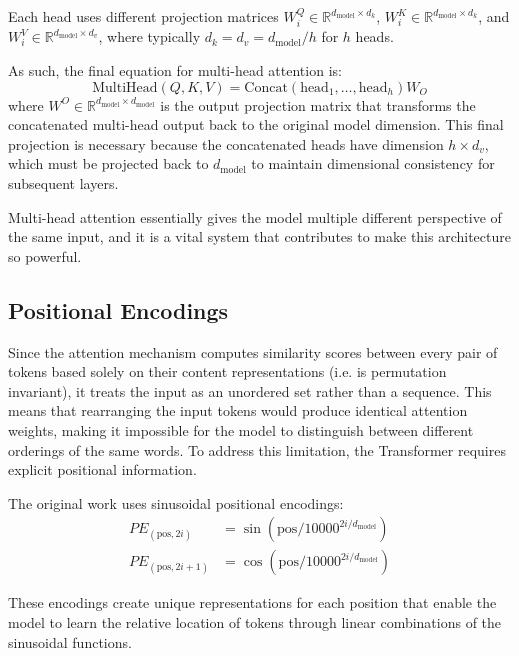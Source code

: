 Each head uses different projection matrices $W_i^Q \in \mathbb{R}^{d_{\text{model}} \times d_k}$, $W_i^K \in \mathbb{R}^{d_{\text{model}} \times d_k}$, and $W_i^V \in \mathbb{R}^{d_{\text{model}} \times d_v}$, where typically $d_k = d_v = d_{\text{model}}/h$ for $h$ heads.

As such, the final equation for multi-head attention is:
\begin{equation}
\text{MultiHead}(Q, K, V) = \text{Concat}(\text{head}_1, \ldots, \text{head}_h)W_O
\end{equation}
where $W^O \in \mathbb{R}^{d_{\text{model}} \times d_{\text{model}}}$ is the output projection matrix that transforms the concatenated multi-head output back to the original model dimension. This final projection is necessary because the concatenated heads have dimension $h \times d_v$, which must be projected back to $d_{\text{model}}$ to maintain dimensional consistency for subsequent layers.

Multi-head attention essentially gives the model multiple different perspective of the same input, and it is a vital system that contributes to make this architecture so powerful.

\subsection{Positional Encodings}

Since the attention mechanism computes similarity scores between every pair of tokens based solely on their content representations  (i.e. is permutation invariant), it treats the input as an unordered set rather than a sequence. This means that rearranging the input tokens would produce identical attention weights, making it impossible for the model to distinguish between different orderings of the same words. To address this limitation, the Transformer requires explicit positional information.

The original work uses sinusoidal positional encodings:
\begin{align}
PE_{(\text{pos}, 2i)} &= \sin(\text{pos}/10000^{2i/d_{\text{model}}}) \\
PE_{(\text{pos}, 2i+1)} &= \cos(\text{pos}/10000^{2i/d_{\text{model}}})
\end{align}

These encodings create unique representations for each position that enable the model to learn the relative location of tokens through linear combinations of the sinusoidal functions.

